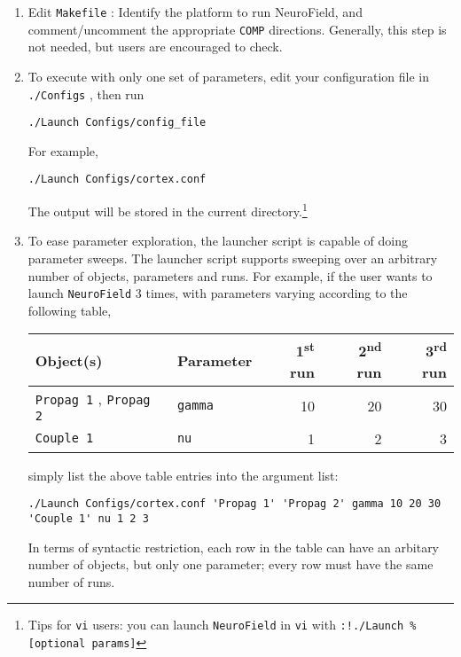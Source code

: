 \documentclass[12pt,a4paper]{article}
\newcommand{\type}[1]{ {\small\small\tt #1} }
\begin{document}
\begin{enumerate}

\item Edit \type{Makefile}: Identify the platform to run NeuroField, and comment/uncomment the appropriate \type{COMP} directions. Generally, this step is not needed, but users are encouraged to check.

\item To execute with only one set of parameters, edit your configuration file in \type{./Configs}, then run
\begin{lstlisting}
./Launch Configs/config_file
\end{lstlisting}
For example,
\begin{lstlisting}
./Launch Configs/cortex.conf
\end{lstlisting}
The output will be stored in the current directory.\footnote{Tips for \type{vi} users: you can launch \type{NeuroField} in \type{vi} with \type{:!./Launch \% [optional params]} }

\item To ease parameter exploration, the launcher script is capable of doing parameter sweeps. The launcher script supports sweeping over an arbitrary number of objects, parameters and runs. For example, if the user wants to launch \type{NeuroField} 3 times, with parameters varying according to the following table,

\begin{tabular}{l l r r r}
Object(s)&Parameter&1\textsuperscript{st} run&2\textsuperscript{nd} run&3\textsuperscript{rd} run\\
\hline
\type{Propag 1}, \type{Propag 2}&\type{gamma}&10&20&30\\
\type{Couple 1}&\type{nu}&1&2&3
\end{tabular}

simply list the above table entries into the argument list:
\begin{lstlisting}
./Launch Configs/cortex.conf 'Propag 1' 'Propag 2' gamma 10 20 30 'Couple 1' nu 1 2 3
\end{lstlisting}

In terms of syntactic restriction, each row in the table can have an arbitary number of objects, but only one parameter; every row must have the same number of runs.


\end{enumerate}
\end{document}
